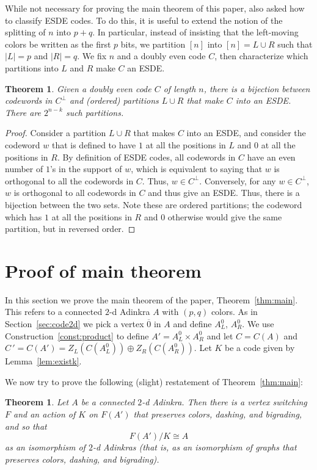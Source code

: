 \documentclass[12pt,twoside,singlespace]{article}
\numberwithin{equation}{section}
\newtheorem{thm}[equation]{Theorem}
\theoremstyle{definition}
\begin{document}
While not necessary for proving the main theorem of this paper, \cite{hubsch:weaving} also asked how to classify ESDE codes.  To do this, it is useful to extend the notion of the splitting of $n$ into $p+q$.  In particular, instead of insisting that the left-moving colors be written as the first $p$ bits, we partition $[n]$ into $[n]=L\cup R$ such that $|L|=p$ and $|R|=q$.  We fix $n$ and a doubly even code $C$, then characterize which partitions into $L$ and $R$ make $C$ an ESDE.

\begin{thm}
\label{thm:esdeclassify}
Given a doubly even code $C$ of length $n$, there is a bijection between codewords in $C^\perp$ and (ordered) partitions $L \cup R$ that make $C$ into an ESDE. There are $2^{n-k}$ such partitions. 
\end{thm}
\begin{proof}
Consider a partition $L \cup R$ that makes $C$ into an ESDE, and consider the codeword $w$ that is defined to have $1$ at all the positions in $L$ and $0$ at all the positions in $R$.  By definition of ESDE codes, all codewords in $C$ have an even number of $1$'s in the support of $w$, which is equivalent to saying that $w$ is orthogonal to all the codewords in $C$. Thus, $w \in C^\perp$.  Conversely, for any $w \in C^\perp$, $w$ is orthogonal to all codewords in $C$ and thus give an ESDE. Thus, there is a bijection between the two sets.  Note these are ordered partitions; the codeword which has $1$ at all the positions in $R$ and $0$ otherwise would give the same partition, but in reversed order.
\end{proof}

\section{Proof of main theorem}
\label{sec:quotient}
In this section we prove the main theorem of the paper, Theorem~\ref{thm:main}.  This refers to a connected $2$-d Adinkra $A$ with $(p,q)$ colors.  As in Section~\ref{sec:code2d} we pick a vertex $\overline{0}$ in $A$ and define $A_L^0$, $A_R^0$.  We use Construction~\ref{const:product} to define $A'=A_L^0\times A_R^0$ and let $C=C(A)$ and $C\,'=C(A')=Z_L(C(A_L^0))\oplus Z_R(C(A_R^0))$.  Let $K$ be a code given by Lemma~\ref{lem:existk}.

We now try to prove the following (slight) restatement of Theorem~\ref{thm:main}:
\begin{thm}
\label{thm:quotient}
Let $A$ be a connected $2$-d Adinkra.  Then there is a vertex switching $F$ and an action of $K$ on $F(A')$ that preserves colors, dashing, and bigrading, and so that
\[F(A')/K\cong A\]
as an isomorphism of $2$-d Adinkras (that is, as an isomorphism of graphs that preserves colors, dashing, and bigrading).
\end{thm}
\end{document}
